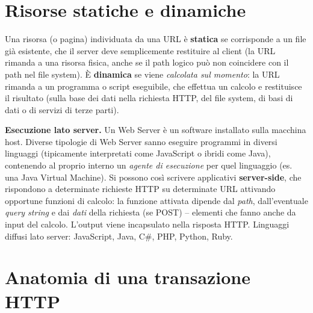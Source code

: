 \section{Risorse statiche e dinamiche}

\begin{definizione}
Una risorsa (o pagina) individuata da una URL \`e \textbf{statica} se corrisponde a un file
gi\`a esistente, che il server deve semplicemente restituire al client (la URL rimanda a una
risorsa fisica, anche se il path logico pu\`o non coincidere con il path nel file system).
\`E \textbf{dinamica} se viene \emph{calcolata sul momento}: la URL rimanda a un programma o
script eseguibile, che effettua un calcolo e restituisce il risultato (sulla base dei dati
nella richiesta HTTP, del file system, di basi di dati o di servizi di terze parti).
\end{definizione}

\textbf{Esecuzione lato server.} Un Web Server \`e un software installato sulla macchina host.
Diverse tipologie di Web Server sanno eseguire programmi in diversi linguaggi (tipicamente
interpretati come JavaScript o ibridi come Java), contenendo al proprio interno un
\emph{agente di esecuzione} per quel linguaggio (es. una Java Virtual Machine). Si possono
cos\`i scrivere applicativi \textbf{server-side}, che rispondono a determinate richieste HTTP
su determinate URL attivando opportune funzioni di calcolo: la funzione attivata dipende dal
\emph{path}, dall'eventuale \emph{query string} e dai \emph{dati} della richiesta (se POST) --
elementi che fanno anche da input del calcolo. L'output viene incapsulato nella risposta HTTP.
Linguaggi diffusi lato server: JavaScript, Java, C\#, PHP, Python, Ruby.

\section{Anatomia di una transazione HTTP}

